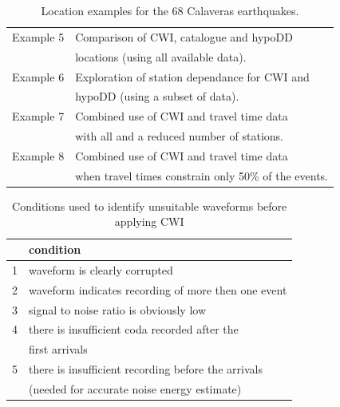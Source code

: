 \documentclass[12pt,double]{article}
\begin{document}
\begin{table}
\caption{Location examples for the 68 Calaveras earthquakes.}
\label{tab:examples}
\begin{tabular}{ll}
\hline
Example 5 & Comparison of CWI, catalogue and hypoDD \\
 & locations (using all available data). \\
Example 6 & Exploration of station dependance for CWI and \\
 & hypoDD (using a subset of data). \\
Example 7 & Combined use of CWI and travel time data \\
& with all and a reduced number of stations. \\
Example 8 & Combined use of CWI and travel time data \\
 & when travel times constrain only 50\% of the events. \\
 \hline
\end{tabular}
\end{table}


\begin{table}
\caption[Conditions for identifying unsuitable waveforms when
applying CWI] {Conditions used to identify unsuitable waveforms
before applying CWI \citep[Originally published as Table
5][]{dr_Robinson11a}} \label{tab:-conditions4unsuitablewaveform}
\begin{tabular}{|l|p{}|}
\hline
 & \textbf{condition} \\
\hline
1 & waveform is clearly corrupted \\
2 & waveform indicates recording of more then one event \\
3 & signal to noise ratio is obviously low \\
4 & there is insufficient coda recorded after the \\
 & first arrivals \\
5 & there is insufficient recording before the arrivals \\
 &  (needed for accurate noise energy estimate) \\
\hline
\end{tabular}
\end{table}

\end{document}
